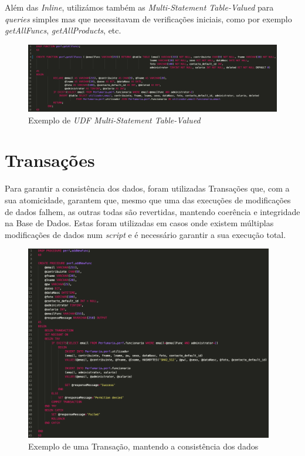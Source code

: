 \documentclass[10pt,portuguese]{article}
\begin{document}
\par Além das \textit{Inline}, utilizámos também as \textit{Multi-Statement Table-Valued} para \textit{queries} simples mas que necessitavam de verificações iniciais, como por exemplo \textit{getAllFuncs}, \textit{getAllProducts}, etc.

\begin{figure}[!h]
    \centering
    \includegraphics[width=\textwidth]{images/getAllFuncs.png}
    \caption{Exemplo de \textit{UDF Multi-Statement Table-Valued}}
\end{figure}

\clearpage

\section{Transações}

\par Para garantir a consistência dos dados, foram utilizadas Transações que, com a sua atomicidade, garantem que, mesmo que uma das execuções de modificações de dados falhem, as outras todas são revertidas, mantendo coerência e integridade na Base de Dados. Estas foram utilizadas em casos onde existem múltiplas modificações de dados num \textit{script} e é necessário garantir a sua execução total.

\begin{figure}[!h]
    \centering
    \includegraphics[width=410]{images/addNewFunc.png}
    \caption{Exemplo de uma Transação, mantendo a consistência dos dados}
\end{figure}
\end{document}
